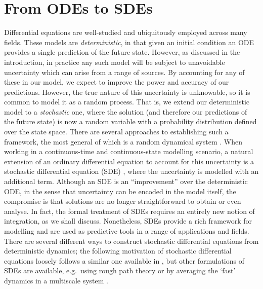 \section{From ODEs to SDEs}
Differential equations are well-studied and ubiquitously employed across many fields.
These models are \emph{deterministic}, in that given an initial condition an ODE provides a single prediction of the future state.
However, as discussed in the introduction, in practice any such model will be subject to unavoidable uncertainty which can arise from a range of sources.
By accounting for any of these in our model, we expect to improve the power and accuracy of our predictions.
However, the true nature of this uncertainty is unknowable, so it is common to model it as a random process.
That is, we extend our deterministic model to a \emph{stochastic} one, where the solution (and therefore our predictions of the future state) is now a random variable with a probability distribution defined over the state space.
There are several approaches to establishing such a framework, the most general of which is a random dynamical system \citep{Arnold_1998_RandomDynamicalSystems,NeckelRupp_2013_RandomDifferentialEquations}.
When working in a continuous-time and continuous-state modelling scenario, a natural extension of an ordinary differential equation to account for this uncertainty is a stochastic differential equation (SDE) \citep{Oksendal_2003_StochasticDifferentialEquations,KallianpurSundar_2014_StochasticAnalysisDiffusion}, where the uncertainty is modelled with an additional term.
Although an SDE is an ``improvement'' over the deterministic ODE, in the sense that uncertainty can be encoded in the model itself, the compromise is that solutions are no longer straightforward to obtain or even analyse.
In fact, the formal treatment of SDEs requires an entirely new notion of integration, as we shall discuss.
Nonetheless, SDEs provide a rich framework for modelling and are used as predictive tools in a range of applications and fields. %
There are several different ways to construct stochastic differential equations from deterministic dynamics; the following motivation of stochastic differential equations loosely follows a similar one available in \citet{Oksendal_2003_StochasticDifferentialEquations}, but other formulations of SDEs are available, e.g.\ using rough path theory \citep{FrizVictoir_2010_MultidimensionalStochasticProcesses} or by averaging the `fast' dynamics in a multiscale system \citep{MelbourneStuart_2011_NoteDiffusionLimits,GottwaldMelbourne_2013_HomogenizationDeterministicMaps,PavliotisStuart_2008_MultiscaleMethods}.

